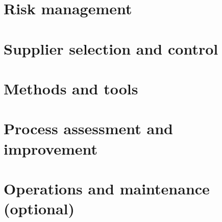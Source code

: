 \section{	Risk management}

\section{	Supplier selection and control}

\section{	Methods and tools}

\section{	Process assessment and improvement}

\section{Operations and maintenance (optional)}



\clearpage
